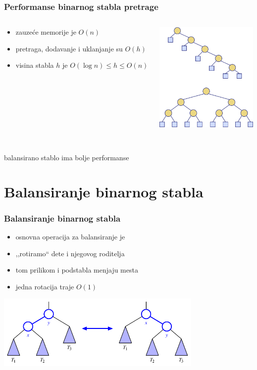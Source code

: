 \documentclass[compress]{beamer}
\begin{document}
\begin{frame}[fragile]
  \frametitle{Performanse binarnog stabla pretrage}
  \begin{columns}
    \begin{column}[c]{6cm}
      \begin{itemize}
        \item zauzeće memorije je $O(n)$
        \item pretraga, dodavanje i uklanjanje su $O(h)$
        \item visina stabla $h$ je $O(\log n) \leq h \leq O(n)$
      \end{itemize}
    \end{column}  
    \begin{column}[c]{6cm}
      \begin{center}
        \includegraphics[width=5cm]{asp-11-pic08.png}
      \end{center}
    \end{column}  
  \end{columns}
  \ \\ \hfill balansirano stablo ima bolje performanse
\end{frame}

\section[Balansiranje]{Balansiranje binarnog stabla}
\begin{frame}[fragile]
  \frametitle{Balansiranje binarnog stabla}
  \begin{itemize}
    \item osnovna operacija za balansiranje je 
    \item ,,rotiramo`` dete i njegovog roditelja
    \item tom prilikom i podstabla menjaju mesta
    \item jedna rotacija traje $O(1)$
  \end{itemize}
  \begin{center}
    \includegraphics[width=10cm]{asp-11-pic09.pdf}
  \end{center}
\end{frame}
\end{document}
